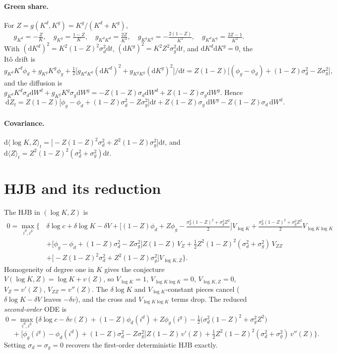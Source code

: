 \documentclass[11pt]{article}
\newcommand{\dd}{\mathrm{d}}
\begin{document}
\paragraph{Green share.} For $Z=g(K^d,K^g)=K^g/(K^d+K^g)$,
\[
g_{K^d}=-\tfrac{Z}{K},\quad g_{K^g}=\tfrac{1-Z}{K},\quad
g_{K^dK^d}=\tfrac{2Z}{K^2},\quad g_{K^gK^g}=-\tfrac{2(1-Z)}{K^2},\quad g_{K^dK^g}=\tfrac{2Z-1}{K^2}.
\]
With $(\dd K^d)^2=K^2(1-Z)^2\sigma_d^2\dd t$, $(\dd K^g)^2=K^2Z^2\sigma_g^2\dd t$, and
$\dd K^d\dd K^g=0$, the It\^o drift is
\[
g_{K^d}K^d\phi_d+g_{K^g}K^g\phi_g+\tfrac12\big[g_{K^dK^d}(\dd K^d)^2+g_{K^gK^g}(\dd K^g)^2\big]/\dd t
=Z(1-Z)\big[(\phi_g-\phi_d)+(1-Z)\sigma_d^2-Z\sigma_g^2\big],
\]
and the diffusion is $g_{K^d}K^d\sigma_d\dd W^d+g_{K^g}K^g\sigma_g\dd W^g
=-Z(1-Z)\sigma_d\dd W^d+Z(1-Z)\sigma_g\dd W^g$. Hence
\[
\boxed{\ \dd Z_t=Z(1-Z)\Big[\phi_g-\phi_d+(1-Z)\sigma_d^2-Z\sigma_g^2\Big]\dd t
+Z(1-Z)\sigma_g\,\dd W^g-Z(1-Z)\sigma_d\,\dd W^d.\ }
\]

\paragraph{Covariance.} $\dd\langle\log K,Z\rangle_t
=\big[-Z(1-Z)^2\sigma_d^2+Z^2(1-Z)\sigma_g^2\big]\dd t$, and
$\dd\langle Z\rangle_t=Z^2(1-Z)^2(\sigma_d^2+\sigma_g^2)\dd t$.

\section{HJB and its reduction}

The HJB in $(\log K,Z)$ is
\begin{align*}
0=\max_{i^d,i^g}\Big\{\,&\delta\log c+\delta\log K-\delta V
+\Big[(1-Z)\phi_d+Z\phi_g-\tfrac{\sigma_d^2(1-Z)^2+\sigma_g^2Z^2}{2}\Big]V_{\log K}
+\tfrac{\sigma_d^2(1-Z)^2+\sigma_g^2Z^2}{2}V_{\log K\log K}\\
&+\big[\phi_g-\phi_d+(1-Z)\sigma_d^2-Z\sigma_g^2\big]Z(1-Z)\,V_Z
+\tfrac12Z^2(1-Z)^2(\sigma_d^2+\sigma_g^2)\,V_{ZZ}\\
&+\big[-Z(1-Z)^2\sigma_d^2+Z^2(1-Z)\sigma_g^2\big]V_{\log K,Z}\Big\}.
\end{align*}
Homogeneity of degree one in $K$ gives the conjecture $V(\log K,Z)=\log K+v(Z)$, so
$V_{\log K}=1$, $V_{\log K\log K}=0$, $V_{\log K,Z}=0$, $V_Z=v'(Z)$, $V_{ZZ}=v''(Z)$.
The $\delta\log K$ and $V_{\log K}$-constant pieces cancel ($\delta\log K-\delta V$
leaves $-\delta v$), and the cross and $V_{\log K\log K}$ terms drop. The reduced
\emph{second-order} ODE is
\[
\boxed{\
0=\max_{i^d,i^g}\Big\{\delta\log c-\delta v(Z)
+(1-Z)\phi_d(i^d)+Z\phi_g(i^g)-\tfrac12\big(\sigma_d^2(1-Z)^2+\sigma_g^2Z^2\big)
}
\]
\[
\boxed{\
\quad+\big[\phi_g(i^g)-\phi_d(i^d)+(1-Z)\sigma_d^2-Z\sigma_g^2\big]Z(1-Z)\,v'(Z)
+\tfrac12Z^2(1-Z)^2(\sigma_d^2+\sigma_g^2)\,v''(Z)\Big\}.\ }
\]
Setting $\sigma_d=\sigma_g=0$ recovers the first-order deterministic HJB exactly.
\end{document}
